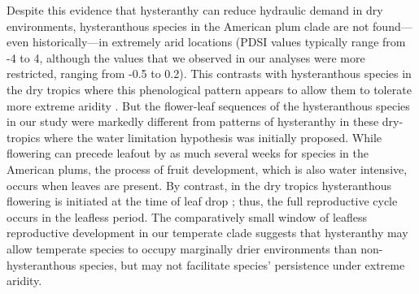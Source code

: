 \documentclass{article}[12pt]
\begin{document}
{{Despite this evidence that hysteranthy can reduce hydraulic demand in dry environments, hysteranthous species in the American plum clade are not found---even historically---in extremely arid locations (PDSI values typically range from -4 to 4, although the values that we observed in our analyses were more restricted, ranging from -0.5 to 0.2). This contrasts with hysteranthous species in the dry tropics where this phenological pattern appears to allow them to tolerate more extreme aridity \citep{Franklin2016}. But the flower-leaf sequences of the hysteranthous species in our study were markedly different from patterns of hysteranthy in these dry-tropics where the water limitation hypothesis was initially proposed. While flowering can precede leafout by as much several weeks for species in the American plums, the process of fruit development, which is also water intensive, occurs when leaves are present. By contrast, in the dry tropics hysteranthous flowering is initiated at the time of leaf drop \citep{Borchert1983,Franklin2016}; thus, the full reproductive cycle occurs in the leafless period. The comparatively small window of leafless reproductive development in our temperate clade %
suggests that hysteranthy may allow temperate species to occupy marginally drier environments than non-hysteranthous species, but may not facilitate species' persistence under extreme aridity.  

 
}}
\end{document}
